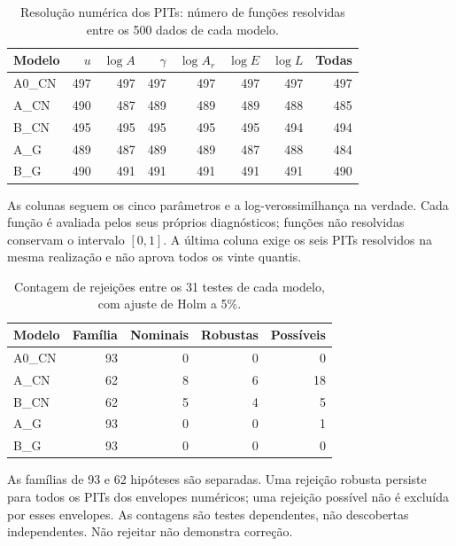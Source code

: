 \begin{table}[htbp]
\centering
\caption{Resolução numérica dos PITs: número de funções resolvidas entre os 500 dados de cada modelo.}
\label{tab:c07-resolucao-producao}
\begingroup\small\setlength{\tabcolsep}{4pt}
\begin{tabular}{@{}lrrrrrrr@{}}
\toprule
Modelo & $u$ & $\log A$ & $\gamma$ & $\log A_r$ & $\log E$ & $\log L$ & Todas \\
\midrule
A0\_CN & 497 & 497 & 497 & 497 & 497 & 497 & 497 \\
A\_CN & 490 & 487 & 489 & 489 & 489 & 488 & 485 \\
B\_CN & 495 & 495 & 495 & 495 & 495 & 494 & 494 \\
A\_G & 489 & 487 & 489 & 489 & 487 & 488 & 484 \\
B\_G & 490 & 491 & 491 & 491 & 491 & 491 & 490 \\
\bottomrule
\end{tabular}
\endgroup
\par\smallskip\begin{minipage}{0.96\textwidth}\footnotesize As colunas seguem os cinco parâmetros e a log-verossimilhança na verdade. Cada função é avaliada pelos seus próprios diagnósticos; funções não resolvidas conservam o intervalo $[0,1]$. A última coluna exige os seis PITs resolvidos na mesma realização e não aprova todos os vinte quantis.\end{minipage}
\end{table}
\begin{table}[htbp]
\centering
\caption{Contagem de rejeições entre os 31 testes de cada modelo, com ajuste de Holm a 5\%.}
\label{tab:c07-testes-producao}
\begingroup\small\setlength{\tabcolsep}{4pt}
\begin{tabular}{@{}lrrrr@{}}
\toprule
Modelo & Família & Nominais & Robustas & Possíveis \\
\midrule
A0\_CN & 93 & 0 & 0 & 0 \\
A\_CN & 62 & 8 & 6 & 18 \\
B\_CN & 62 & 5 & 4 & 5 \\
A\_G & 93 & 0 & 0 & 1 \\
B\_G & 93 & 0 & 0 & 0 \\
\bottomrule
\end{tabular}
\endgroup
\par\smallskip\begin{minipage}{0.96\textwidth}\footnotesize As famílias de 93 e 62 hipóteses são separadas. Uma rejeição robusta persiste para todos os PITs dos envelopes numéricos; uma rejeição possível não é excluída por esses envelopes. As contagens são testes dependentes, não descobertas independentes. Não rejeitar não demonstra correção.\end{minipage}
\end{table}
